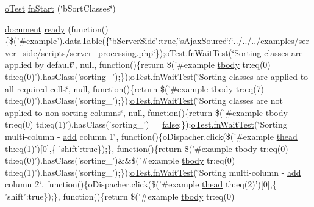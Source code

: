 \begin{DoxyCompactItemize}
\item 
\hyperlink{unit__test_8js_a3b2d259e2df3b6860d9047a92d09d0d6}{o\+Test} \hyperlink{4__server-side_2b_sort_classes_8js_a81c22252b45bc24b1e8f9f9999988040}{fn\+Start} (\char`\"{}b\+Sort\+Classes\char`\"{})
\item 
\hyperlink{outside_events_8js_aa14f8e0338cced6720590fd2ea13bd4b}{document} \hyperlink{4__server-side_2b_sort_classes_8js_ad30d0382c65abe9b711a744c28a15862}{ready} (function()\{\$('\#example').data\+Table(\{\char`\"{}b\+Server\+Side\char`\"{}\+:true,\char`\"{}s\+Ajax\+Source\char`\"{}\+:\char`\"{}../../../examples/server\+\_\+side/\hyperlink{tinymce_8jquery_8dev_8js_a09066d4d580eeec222f858d588b4cdef}{scripts}/server\+\_\+processing.\+php\char`\"{}\});o\+Test.\+fn\+Wait\+Test(\char`\"{}Sorting classes are applied by default\char`\"{}, null, function()\{return \$('\#example \hyperlink{core_8constructor_8js_a99b0542c7c50fe8757c55bf9dac5f3be}{tbody} tr\+:eq(0) td\+:eq(0)').has\+Class('sorting\+\_');\});\hyperlink{onhold_24__server-side_2__zero__config_8js_ab25c4d596771c0133cdc45178ce72c3d}{o\+Test.\+fn\+Wait\+Test}(\char`\"{}Sorting classes are applied \hyperlink{jquery-ui_8js_af6086621f45baa2cf538f19e45d3c263}{to} all required cells\char`\"{}, null, function()\{return \$('\#example \hyperlink{core_8constructor_8js_a99b0542c7c50fe8757c55bf9dac5f3be}{tbody} tr\+:eq(7) td\+:eq(0)').has\+Class('sorting\+\_');\});\hyperlink{onhold_24__server-side_2__zero__config_8js_ab25c4d596771c0133cdc45178ce72c3d}{o\+Test.\+fn\+Wait\+Test}(\char`\"{}Sorting classes are not applied \hyperlink{jquery-ui_8js_af6086621f45baa2cf538f19e45d3c263}{to} non-\/sorting \hyperlink{model_8defaults_8columns_8js_af310571d7a4fac04bd949bdefb852a47}{columns}\char`\"{}, null, function()\{return \$('\#example \hyperlink{core_8constructor_8js_a99b0542c7c50fe8757c55bf9dac5f3be}{tbody} tr\+:eq(0) td\+:eq(1)').has\+Class('sorting\+\_')==\hyperlink{validate_8js_a5df37b7f02e5cdc7d9412b7f872b8e01}{false};\});\hyperlink{onhold_24__server-side_2__zero__config_8js_ab25c4d596771c0133cdc45178ce72c3d}{o\+Test.\+fn\+Wait\+Test}(\char`\"{}Sorting multi-\/column -\/ \hyperlink{theme_8min_8js_a1833965973c7833716346fa64230bb38}{add} column 1\char`\"{}, function()\{o\+Dispacher.\+click(\$('\#example \hyperlink{core_8constructor_8js_a856be760b6816c9591ce69f0a2b43693}{thead} th\+:eq(1)')\mbox{[}0\mbox{]},\{ 'shift'\+:true\});\}, function()\{return \$('\#example \hyperlink{core_8constructor_8js_a99b0542c7c50fe8757c55bf9dac5f3be}{tbody} tr\+:eq(0) td\+:eq(0)').has\+Class('sorting\+\_')\&\&\$('\#example \hyperlink{core_8constructor_8js_a99b0542c7c50fe8757c55bf9dac5f3be}{tbody} tr\+:eq(0) td\+:eq(1)').has\+Class('sorting\+\_');\});\hyperlink{onhold_24__server-side_2__zero__config_8js_ab25c4d596771c0133cdc45178ce72c3d}{o\+Test.\+fn\+Wait\+Test}(\char`\"{}Sorting multi-\/column -\/ \hyperlink{theme_8min_8js_a1833965973c7833716346fa64230bb38}{add} column 2\char`\"{}, function()\{o\+Dispacher.\+click(\$('\#example \hyperlink{core_8constructor_8js_a856be760b6816c9591ce69f0a2b43693}{thead} th\+:eq(2)')\mbox{[}0\mbox{]},\{ 'shift'\+:true\});\}, function()\{return \$('\#example \hyperlink{core_8constructor_8js_a99b0542c7c50fe8757c55bf9dac5f3be}{tbody} tr\+:eq(0) 
\end{DoxyCompactItemize}
